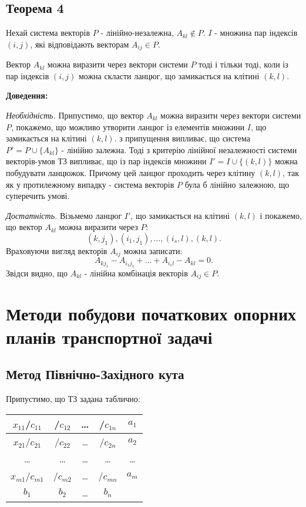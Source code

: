\documentclass[12pt,a4paper]{book}
\begin{document}
\subsection{Теорема 4}

Нехай система векторів $P$ - лінійно-незалежна, $A_{kl} \notin P$. $I$ - множина пар індексів $(i,j)$, які відповідають векторам $A_{ij} \in P$.

Вектор $A_{kl}$ можна виразити через вектори системи $P$ тоді і тільки тоді, коли із пар індексів $(i,j)$ можна скласти ланцюг, що замикається на клітині $(k,l)$.

{\bf Доведення:}

{\it Необхідність.} Припустимо, що вектор $A_{kl}$ можна виразити через вектори системи $P$, покажемо, що можливо утворити ланцюг із елементів множини $I$, що замикається на клітині $(k,l)$. з припущення випливає, що система $P'=P \cup \{A_{kl}\}$ - лінійно залежна. Тоді з критерію лінійної незалежності системи векторів-умов ТЗ випливає, що із пар індексів множини $I'=I \cup \{(k,l)\}$ можна побудувати ланцюжок. Причому цей ланцюг проходить через клітину $(k,l)$, так як у протилежному випадку - система векторів $P$ була б лінійно залежною, що суперечить умові.

{\it Достатність.} Візьмемо ланцюг $I'$, що замикається на клітині $(k,l)$ і покажемо, що вектор $A_{kl}$ можна виразити через $P$:
$$(k,j_1),(i_1,j_1),\dots,(i_s,l),(k,l).$$
Враховуючи вигляд векторів $A_{ij}$ можна записати:
$$A_{kj_1} - A_{i_1j_1} + \dots + A_{i_sl} - A_{kl} = 0.$$
Звідси видно, що $A_{kl}$ - лінійна комбінація векторів $A_{ij} \in P$.


\section{Методи побудови початкових опорних планів транспортної задачі}

\subsection{Метод Північно-Західного кута}

Припустимо, що ТЗ задана таблично:\\
\begin{tabular}{ | c | c | c | c | c |}
\hline
$x_{11}$/$c_{11}$	&	/$c_{12}$	&	\dots	&	/$c_{1n}$	&	$a_1$\\
\hline
$x_{21}$/$c_{21}$	&	/$c_{22}$	&	\dots	&	/$c_{2n}$	&	$a_2$\\
\hline
\dots	&	\dots	&	\dots	&	\dots	&	\dots\\
\hline
$x_{m1}$/$c_{m1}$	&	/$c_{m2}$	&	\dots	&	/$c_{mn}$	&	$a_m$\\
\hline
$b_1$	&	$b_2$	&	\dots	&	$b_n$	&\\
\hline
\end{tabular}
\end{document}

